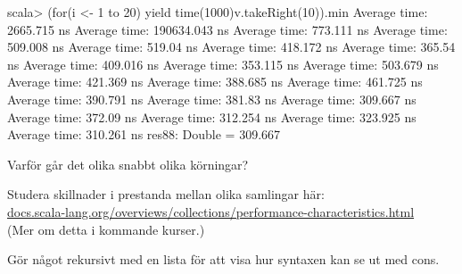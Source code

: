 \begin{REPLnonum}
scala> (for(i <- 1 to 20) yield time(1000){v.takeRight(10)}).min
Average time: 2665.715 ns
Average time: 190634.043 ns
Average time: 773.111 ns
Average time: 509.008 ns
Average time: 519.04 ns
Average time: 418.172 ns
Average time: 365.54 ns
Average time: 409.016 ns
Average time: 353.115 ns
Average time: 503.679 ns
Average time: 421.369 ns
Average time: 388.685 ns
Average time: 461.725 ns
Average time: 390.791 ns
Average time: 381.83 ns
Average time: 309.667 ns
Average time: 372.09 ns
Average time: 312.254 ns
Average time: 323.925 ns
Average time: 310.261 ns
res88: Double = 309.667

\end{REPLnonum}

\Subtask Varför går det olika snabbt olika körningar?

\Task Studera skillnader i prestanda mellan olika samlingar här: \\ \href{http://docs.scala-lang.org/overviews/collections/performance-characteristics.html}{docs.scala-lang.org/overviews/collections/performance-characteristics.html} \\
(Mer om detta i kommande kurser.)

\Task Gör något rekursivt med en lista för att visa hur syntaxen kan se ut med cons.
    